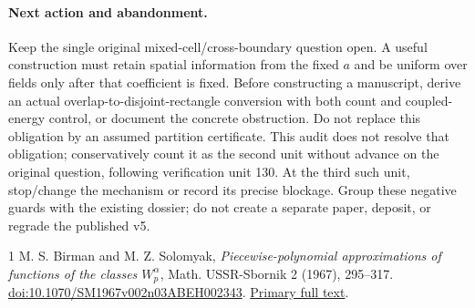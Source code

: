 \documentclass[11pt]{article}
\begin{document}
\paragraph{Next action and abandonment.}
Keep the single original mixed-cell/cross-boundary question open. A useful
construction must retain spatial information from the fixed $a$ and be
uniform over fields only after that coefficient is fixed. Before constructing
a manuscript, derive an actual overlap-to-disjoint-rectangle conversion with
both count and coupled-energy control, or document the concrete obstruction.
Do not replace this obligation by an assumed partition certificate. This
audit does not resolve that obligation; conservatively count it as the second
unit without advance on the original question, following verification unit
130. At the third such unit, stop/change the mechanism or record its precise
blockage. Group these negative guards with the existing dossier; do not create
a separate paper, deposit, or regrade the published v5.

\begin{thebibliography}{1}
 M. S. Birman and M. Z. Solomyak,
\emph{Piecewise-polynomial approximations of functions of the classes
$W_p^\alpha$}, Math. USSR-Sbornik 2 (1967), 295--317.
\href{https://doi.org/10.1070/SM1967v002n03ABEH002343}{doi:10.1070/SM1967v002n03ABEH002343}.
\href{https://www.mathnet.ru/php/getFT.phtml?jrnid=sm\&paperid=4132\&what=fullteng}{Primary full text}.
\end{thebibliography}
\end{document}
